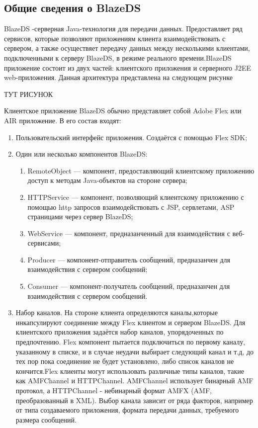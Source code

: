 \subsection{Общие сведения о BlazeDS}
BlazeDS -серверная Java-технология для передачи данных. Предоставляет ряд сервисов, которые позволяют приложениям 
клиента взаимодействовать с сервером, а также осуществяет передачу данных между несколькими клиентами, подключенными 
к серверу BlazeDS, в режиме реального времени.BlazeDS приложение состоит из двух частей: клиентского приложения и серверного 
J2EE web-приложения. Данная архитектура представлена на следующем рисунке

ТУТ РИСУНОК

Клиентское приложение BlazeDS обычно представляет собой Adobe Flex или AIR приложение. В его состав входят: 

\begin{enumerate}
\item Пользовательский интерфейс приложения. Создаётся с помощью Flex SDK;
\item Один или несколько компонентов BlazeDS: 
\begin{enumerate}
\item RemoteObject --- компонент, предоставляющий клиентскому приложению доступ к методам Java-объектов на стороне сервера; 
\item HTTPService --- компонент, позволяющий клиентскому приложению с помощью http запросов взаимодействовать с JSP, сервлетами, 
ASP страницами через сервер BlazeDS;
\item WebService --- компонент, предназанченный для взаимодействия с веб-сервисами;
\item Producer --- компонент-отправитель сообщений, предназанчен для взаимодействия с сервером сообщений;
\item Consumer --- компонент-получатель сообщений, предназанчен для взаимодействия с сервером сообщений.
\end{enumerate}
\item Набор каналов. На стороне клиента определяются каналы,которые инкапсулируют соединение между Flex клиентом и сервером 
BlazeDS. Для клиентского приложения задаётся набор каналов, упорядоченных по предпочтению. Flex компонент пытается подключиться 
по первому каналу, указанному в списке, и в случае неудачи выбирает следующий канал и т.д, до тех пор пока соединение не будет 
установлено, либо список каналов не кончится.Flex клиенты могут использовать различные типы каналов, такие как AMFChannel и 
HTTPChannel. AMFChannel использует бинарный AMF протокол, а HTTPChannel - небинарный формат AMFX (AMF, преобразованный в XML). 
Выбор канала зависит от ряда факторов, например от типа создаваемого приложения, формата передачи данных, требуемого размера 
сообщений.
\end{enumerate}

